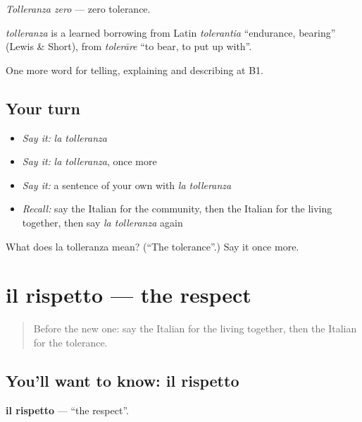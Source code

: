 \emph{Tolleranza zero} — zero tolerance.

\begin{cousinweb}
\emph{tolleranza} is a learned borrowing from Latin \emph{tolerantia} \textquotedblleft{}endurance, bearing\textquotedblright{} (Lewis \& Short), from \emph{tolerāre} \textquotedblleft{}to bear, to put up with\textquotedblright{}.
\end{cousinweb}

\begin{grammarlens}[title={What you've built}]
One more word for telling, explaining and describing at B1.
\end{grammarlens}

\subsection*{Your turn}
\begin{itemize}
\raggedright
  \item \emph{Say it:} \emph{la tolleranza}
  \item \emph{Say it:} \emph{la tolleranza}, once more
  \item \emph{Say it:} a sentence of your own with \emph{la tolleranza}
  \item \emph{Recall:} say the Italian for the community, then the Italian for the living together, then say \emph{la tolleranza} again
\end{itemize}

\begin{tcolorbox}[breakable,colback=teal!4,colframe=teal!35!black,title={Before you move on}]
What does la tolleranza mean? (\textquotedblleft{}The tolerance\textquotedblright{}.) Say it once more.
\end{tcolorbox}
\section[il rispetto]{il rispetto — the respect}

\label{lesson:IT-C368-rispetto}



\begin{quote}
Before the new one: say the Italian for the living together, then the Italian for the tolerance.
\end{quote}

\subsection*{You'll want to know: il rispetto}
\textbf{il rispetto} — \textquotedblleft{}the respect\textquotedblright{}.

